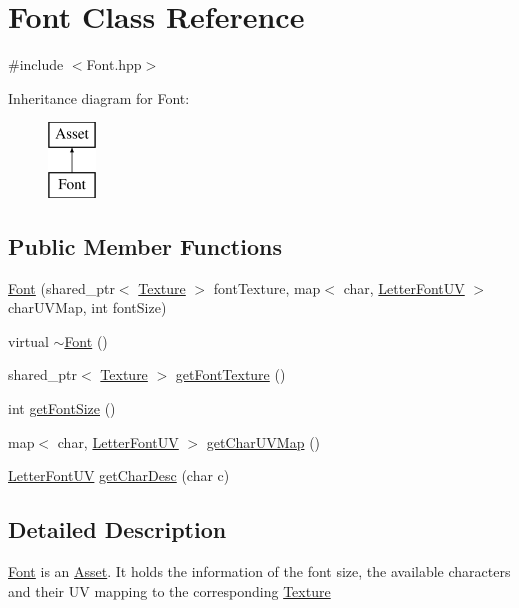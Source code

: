\hypertarget{class_font}{}\section{Font Class Reference}
\label{class_font}


{\ttfamily \#include $<$Font.\+hpp$>$}

Inheritance diagram for Font\+:\begin{figure}[H]
\begin{center}
\leavevmode
\includegraphics[height=2.000000cm]{class_font}
\end{center}
\end{figure}
\subsection*{Public Member Functions}
\begin{DoxyCompactItemize}
\item 
\hyperlink{class_font_ab17ce6ae9fe536a4b8cf3ecf2b8d4913}{Font} (shared\+\_\+ptr$<$ \hyperlink{class_texture}{Texture} $>$ font\+Texture, map$<$ char, \hyperlink{struct_letter_font_u_v}{Letter\+Font\+U\+V} $>$ char\+U\+V\+Map, int font\+Size)
\item 
virtual \hyperlink{class_font_afcb2c2e708187a600a6129e2719bcd81}{$\sim$\+Font} ()
\item 
shared\+\_\+ptr$<$ \hyperlink{class_texture}{Texture} $>$ \hyperlink{class_font_a4aeb5630943d4b9d65030c108291c874}{get\+Font\+Texture} ()
\item 
int \hyperlink{class_font_a3f4d697a2464f49dcdb92e7735e096a2}{get\+Font\+Size} ()
\item 
map$<$ char, \hyperlink{struct_letter_font_u_v}{Letter\+Font\+U\+V} $>$ \hyperlink{class_font_a880e278802c289b129600856d297d8ff}{get\+Char\+U\+V\+Map} ()
\item 
\hyperlink{struct_letter_font_u_v}{Letter\+Font\+U\+V} \hyperlink{class_font_a9a3127bceaad861d759a2f52e9b479e4}{get\+Char\+Desc} (char c)
\end{DoxyCompactItemize}


\subsection{Detailed Description}
\hyperlink{class_font}{Font} is an \hyperlink{class_asset}{Asset}. It holds the information of the font size, the available characters and their U\+V mapping to the corresponding \hyperlink{class_texture}{Texture} 

